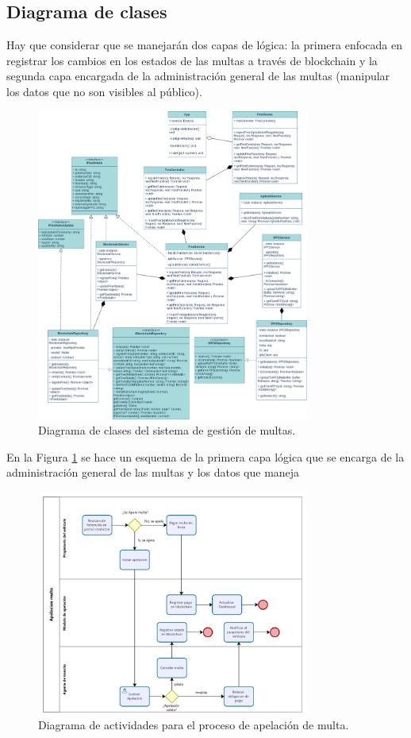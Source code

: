  \subsection{ Diagrama de clases }
Hay que considerar que se manejarán dos capas de lógica: la primera enfocada en registrar los cambios en los estados de las multas a través de blockchain y la segunda capa encargada de la administración general de las multas (manipular los datos que no son visibles al público). 
 \begin{figure}[htbp]
    \centering
    \includegraphics[width=0.8\textwidth]{Images/uml.png}
    \caption{Diagrama de clases del sistema de gestión de multas.}
    \label{fig:diagrama_clases}
\end{figure}
En la Figura \ref{fig:diagrama_clases} se hace un esquema de la primera capa lógica que se encarga de la administración general de las multas y los datos que maneja
 \begin{figure}[htbp]
    \centering
    \includegraphics[width=0.8\textwidth]{Images/ActApelacion.png}
    \caption{Diagrama de actividades para el proceso de apelación de multa.}
    \label{fig:diagrama_apelacion}
\end{figure}
